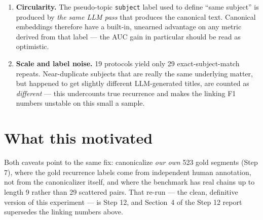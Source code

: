 \documentclass[11pt,a4paper]{article}
\begin{document}
\begin{enumerate}[leftmargin=1.4em]
\item \textbf{Circularity.} The pseudo-topic \texttt{subject} label used to define
  ``same subject'' is produced by \emph{the same LLM pass} that produces the canonical
  text. Canonical embeddings therefore have a built-in, unearned advantage on any metric
  derived from that label --- the AUC gain in particular should be read as optimistic.
\item \textbf{Scale and label noise.} 19 protocols yield only 29 exact-subject-match
  repeats. Near-duplicate subjects that are really the same underlying matter, but happened
  to get slightly different LLM-generated titles, are counted as \emph{different} --- this
  undercounts true recurrence and makes the linking F1 numbers unstable on this small a
  sample.
\end{enumerate}

\section{What this motivated}

Both caveats point to the same fix: canonicalize \emph{our own} 523 gold segments (Step 7),
where the gold recurrence labels come from independent human annotation, not from the
canonicalizer itself, and where the benchmark has real chains up to length 9 rather than 29
scattered pairs. That re-run --- the clean, definitive version of this experiment --- is
Step 12, and Section~4 of the Step 12 report supersedes the linking numbers above.
\end{document}
